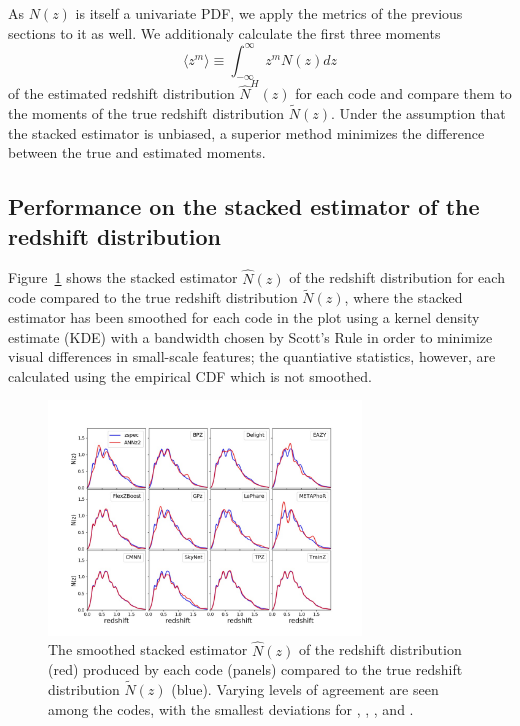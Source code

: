 As $N(z)$ is itself a univariate PDF, we apply the metrics of the previous sections to it as well.
We additionaly calculate the first three moments
\begin{equation}
  \label{eq:moment}
  \langle z^{m}\rangle \equiv \int_{-\infty}^{\infty} z^{m} N(z) dz
\end{equation}
of the estimated redshift distribution $\hat{N}^{H}(z)$ for each code and compare them to the moments of the true redshift distribution $\tilde{N}(z)$.
Under the assumption that the stacked estimator is unbiased, a superior method minimizes the difference between the true and estimated moments.

\subsection{Performance on the stacked estimator of the redshift distribution}
\label{sec:stackedmetrics_results}

Figure~\ref{fig:nz} shows the stacked estimator $\hat{N}(z)$ of the redshift distribution for each code compared to the true redshift distribution $\tilde{N}(z)$, where the stacked estimator has been smoothed for each code in the plot using a kernel density estimate (KDE) with a bandwidth chosen by Scott's Rule \citep{Scott:1992} in order to minimize visual differences in small-scale features; the quantiative statistics, however, are calculated using the empirical CDF which is not smoothed.

\begin{figure}
\centering
\includegraphics[width=0.74\textwidth]{fig/NZsumplot_12codes_scottsrule_biglabels.jpg}
\caption{The smoothed stacked estimator $\hat{N}(z)$ of the redshift distribution (red) produced by each code (panels) compared to the true redshift distribution $\tilde{N}(z)$ (blue).
Varying levels of agreement are seen among the codes, with the smallest deviations for \cmnn, \flexzboost, \tpz, and \trainz.}
\label{fig:nz}
\end{figure}

